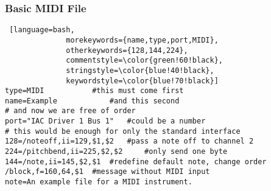 \documentclass[../main.tex]{subfiles}
\begin{document}
\subsubsection{Basic MIDI File}
\begin{lstlisting} [language=bash,
			  morekeywords={name,type,port,MIDI},
			  otherkeywords={128,144,224},
			  commentstyle=\color{green!60!black},
			  stringstyle=\color{blue!40!black},
			  keywordstyle=\color{blue!70!black}]
type=MIDI 			#this must come first
name=Example			#and this second
# and now we are free of order
port="IAC Driver 1 Bus 1" 	#could be a number
# this would be enough for only the standard interface
128=/noteoff,ii=129,$1,$2 	#pass a note off to channel 2
224=/pitchbend,ii=225,$2,$2 	#only send one byte
144=/note,ii=145,$2,$1	#redefine default note, change order
/block,f=160,64,$1	#message without MIDI input
note=An example file for a MIDI instrument.
\end{lstlisting}

\vspace{3cm}
\end{document}
